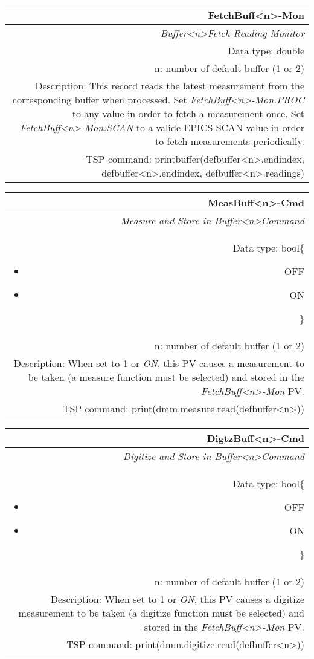 \documentclass[openany]{article}
\begin{document}
		\begin{tabular}{N}
			\hline
			\bfseries FetchBuff\textless n\textgreater-Mon\label{pv:fetchbuff-mon} \\ \hline
			\emph{Buffer\textless n\textgreater Fetch Reading Monitor} \\
			Data type: double \\
			n: number of default buffer (1 or 2) \\
			Description: This record reads the latest measurement from the corresponding buffer when processed. Set \emph{FetchBuff\textless n\textgreater-Mon.PROC} to any value in order to fetch a measurement once. Set \emph{FetchBuff\textless n\textgreater-Mon.SCAN} to a valide EPICS SCAN value in order to fetch measurements periodically. \\
			TSP command: printbuffer(defbuffer\textless n\textgreater.endindex, defbuffer\textless n\textgreater.endindex, defbuffer\textless n\textgreater.readings)
		\end{tabular}

		\begin{tabular}{N}
			\hline
			\bfseries MeasBuff\textless n\textgreater-Cmd\label{pv:measbuff-cmd} \\ \hline
			\emph{Measure and Store in Buffer\textless n\textgreater Command} \\
			Data type: bool\{\begin{itemize}[noitemsep]
				\small
				\item[] OFF
				\item[] ON
			\end{itemize}\} \\
			n: number of default buffer (1 or 2) \\
			Description: When set to 1 or \emph{ON}, this PV causes a measurement to be taken (a measure function must be selected) and stored in the \emph{FetchBuff\textless n\textgreater-Mon} PV. \\
			TSP command: print(dmm.measure.read(defbuffer\textless n\textgreater))
		\end{tabular}

		\begin{tabular}{N}
			\hline
			\bfseries DigtzBuff\textless n\textgreater-Cmd\label{pv:digtzbuff-cmd} \\ \hline
			\emph{Digitize and Store in Buffer\textless n\textgreater Command} \\
			Data type: bool\{\begin{itemize}[noitemsep]
				\small
				\item[] OFF
				\item[] ON
			\end{itemize}\} \\
			n: number of default buffer (1 or 2) \\
			Description: When set to 1 or \emph{ON}, this PV causes a digitize measurement to be taken (a digitize function must be selected) and stored in the \emph{FetchBuff\textless n\textgreater-Mon} PV. \\
			TSP command: print(dmm.digitize.read(defbuffer\textless n\textgreater))
		\end{tabular}
\end{document}
